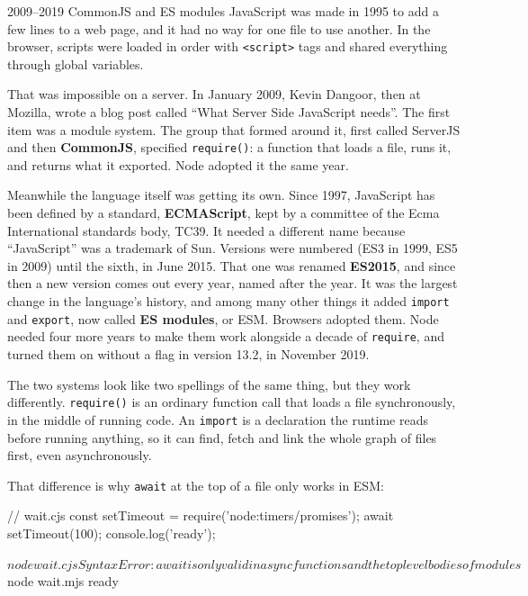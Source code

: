 \begin{history}{2009--2019 \textperiodcentered{} CommonJS and ES modules}
JavaScript was made in 1995 to add a few lines to a web page, and it had no way
for one file to use another. In the browser, scripts were loaded in order with
\texttt{<script>} tags and shared everything through global variables.

That was impossible on a server. In January 2009, Kevin Dangoor, then at
Mozilla, wrote a blog post called ``What Server Side JavaScript needs''. The
first item was a module system. The group that formed around it, first called
ServerJS and then \textbf{CommonJS}, specified \texttt{require()}: a function
that loads a file, runs it, and returns what it exported. Node adopted it the
same year.

Meanwhile the language itself was getting its own. Since 1997, JavaScript has
been defined by a standard, \textbf{ECMAScript}, kept by a committee of the
Ecma International standards body, TC39. It needed a different name because
``JavaScript'' was a trademark of Sun. Versions were numbered (ES3 in 1999, ES5
in 2009) until the sixth, in June 2015. That one was renamed \textbf{ES2015},
and since then a new version comes out every year, named after the year. It was
the largest change in the language's history, and among many other things it
added \texttt{import} and \texttt{export}, now called \textbf{ES modules}, or
ESM. Browsers adopted them. Node needed four more
years to make them work alongside a decade of \texttt{require}, and turned them
on without a flag in version 13.2, in November 2019.
\end{history}

The two systems look like two spellings of the same thing, but they work
differently. \texttt{require()} is an ordinary function call that loads a file synchronously,
in the middle of running code. An \texttt{import} is a declaration the runtime
reads before running anything, so it can find, fetch and link the whole graph
of files first, even asynchronously.

That difference is why \texttt{await} at the top of a file only works in ESM:

\begin{code}
// wait.cjs
const { setTimeout } = require('node:timers/promises');
await setTimeout(100);
console.log('ready');
\end{code}

\begin{terminal}
$ node wait.cjs
SyntaxError: await is only valid in async functions and the top level bodies of modules
$ node wait.mjs
ready
\end{terminal}

